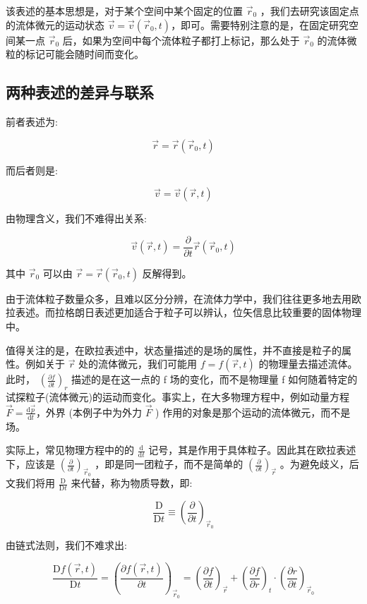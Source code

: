 \documentclass[fontset=windows]{article}
\newcommand{\upcite}[1]{\textsuperscript{\cite{#1}}}
\begin{document}
该表述的基本思想是，对于某个空间中某个固定的位置 $ \vec{r}_0 $ ，我们去研究该固定点的流体微元的运动状态 $\vec{v} = \vec{v}(\vec{r}_0,t)$，即可。需要特别注意的是，在固定研究空间某一点 $ \vec{r}_0 $ 后，如果为空间中每个流体粒子都打上标记，那么处于 $ \vec{r}_0 $ 的流体微粒的标记可能会随时间而变化。

\subsection{两种表述的差异与联系}

前者表述为:

$$\vec{r} = \vec{r}(\vec{r}_0,t)$$

而后者则是:

$$\vec{v} = \vec{v}(\vec{r},t)$$

由物理含义，我们不难得出关系:

$$\vec{v}(\vec{r},t) = \frac{\partial}{\partial t} \vec{r}(\vec{r}_0,t) $$

其中 $\vec{r}_0$ 可以由 $ \vec{r} = \vec{r}(\vec{r}_0,t) $ 反解得到。

由于流体粒子数量众多，且难以区分分辨，在流体力学中，我们往往更多地去用欧拉表述。而拉格朗日表述更加适合于粒子可以辨认，位矢信息比较重要的固体物理中。

值得关注的是，在欧拉表述中，状态量描述的是场的属性，并不直接是粒子的属性。例如关于 $\vec{r}$ 处的流体微元，我们可能用 $f = f(\vec{r},t)$ 的物理量去描述流体。此时， $(\frac{\partial f}{\partial t})_r$ 描述的是在这一点的 f 场的变化，而不是物理量 f 如何随着特定的试探粒子(流体微元)的运动而变化。事实上，在大多物理方程中，例如动量方程 $\vec{F} = \frac{\mathrm{d}\vec{p}}{\mathrm{d}t}$，外界 (本例子中为外力 $\vec{F}$ ) 作用的对象是那个运动的流体微元，而不是场。

实际上，常见物理方程中的的 $\frac{\mathrm{d}}{\mathrm{d}t}$ 记号，其是作用于具体粒子。因此其在欧拉表述下，应该是 $(\frac{\partial}{\partial t})_{\vec{r}_0}$ ，即是同一团粒子，而不是简单的 $(\frac{\partial}{\partial t})_{\vec{r}}$ 。为避免歧义，后文我们将用 $\frac{\mathrm{D}}{\mathrm{D}t}$ 来代替，称为物质导数\upcite{ref0}，即:

$$
\frac{\mathrm{D}}{\mathrm{D}t} 
\equiv (\frac{\partial}{\partial t})_{\vec{r}_0}
$$

由链式法则，我们不难求出:

$$
\frac{\mathrm{D}f(\vec{r},t)}{\mathrm{D}t}
= (\frac{\partial f(\vec{r},t)}{\partial t})_{\vec{r}_0}
= (\frac{\partial f}{\partial t})_{\vec{r}}
+ (\frac{\partial f}{\partial r})_t \cdot (\frac{\partial r}{\partial t})_{\vec{r}_0}
$$
\end{document}
